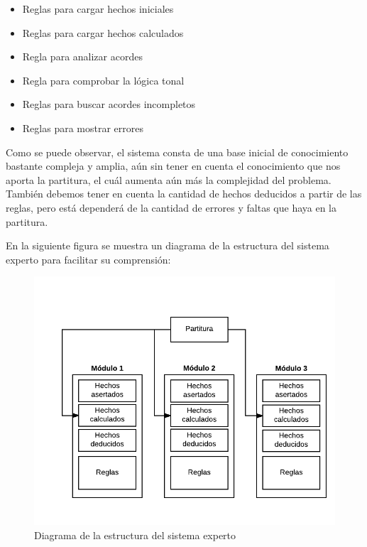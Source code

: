 \begin{itemize}
\begin{itemize}
			\begin{itemize}

				\item Reglas para cargar hechos iniciales

				\item Reglas para cargar hechos calculados

				\item Regla para analizar acordes

				\item Regla para comprobar la lógica tonal

				\item Reglas para buscar acordes incompletos

				\item Reglas para mostrar errores

			\end{itemize}
			
	\end{itemize}

\end{itemize}

\bigskip

Como se puede observar, el sistema consta de una base inicial de conocimiento bastante compleja y amplia, aún sin tener en cuenta el conocimiento que nos aporta la partitura, el cuál aumenta aún más la complejidad del problema. También debemos tener en cuenta la cantidad de hechos deducidos a partir de las reglas, pero está dependerá de la cantidad de errores y faltas que haya en la partitura. 

\bigskip

En la siguiente figura se muestra un diagrama de la estructura del sistema experto para facilitar su comprensión:

\begin{figure}[H]
	\centering
	\includegraphics[scale=1]{imagenes/estructuraExp.png}
	\caption{Diagrama de la estructura del sistema experto}
	\label{fig3.1}
\end{figure}